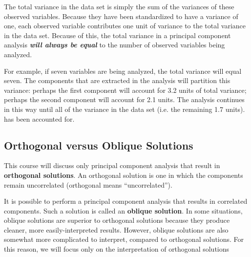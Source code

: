 \documentclass[a4paper,12pt]{article}
\begin{document}
The total variance in the
data set is simply the sum of the variances of these observed variables.  Because they have
been standardized to have a variance of one, each observed variable contributes one unit of
variance to the total variance in the data set.  Because of this, the total variance in a
principal component analysis \textbf{\emph{will always be equal}} to the number of observed variables
being analyzed.

For example, if seven variables are being analyzed, the total variance will
equal seven.  The components that are extracted in the analysis will partition this variance:
perhaps the first component will account for 3.2 units of total variance; perhaps the second
component will account for 2.1 units.  The analysis continues in this way until all of the
variance in the data set (i.e. the remaining 1.7 units). has been accounted for.

\subsection{Orthogonal versus Oblique Solutions}

This course will discuss only principal component analysis that result in \textbf{orthogonal solutions}.
An orthogonal solution is one in which the components remain uncorrelated (orthogonal means
“uncorrelated”).

It is possible to perform a principal component analysis that results in correlated components.
Such a solution is called an \textbf{oblique solution}.  In some situations, oblique solutions are superior
to orthogonal solutions because they produce cleaner, more easily-interpreted results.
However, oblique solutions are also somewhat more complicated to interpret, compared to
orthogonal solutions.  For this reason, we will focus only on the interpretation of orthogonal solutions
\end{document}
